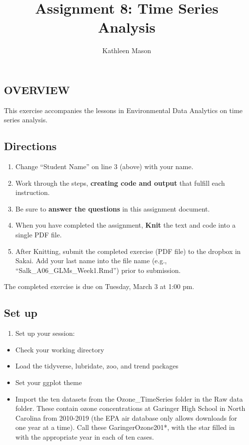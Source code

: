 \documentclass[]{article}
\title{Assignment 8: Time Series Analysis}
\author{Kathleen Mason}
\date{}
\providecommand{\tightlist}{%
  \setlength{\itemsep}{0pt}\setlength{\parskip}{0pt}}
\begin{document}
\maketitle

\hypertarget{overview}{%
\subsection{OVERVIEW}\label{overview}}

This exercise accompanies the lessons in Environmental Data Analytics on
time series analysis.

\hypertarget{directions}{%
\subsection{Directions}\label{directions}}

\begin{enumerate}
\def\labelenumi{\arabic{enumi}.}
\tightlist
\item
  Change ``Student Name'' on line 3 (above) with your name.
\item
  Work through the steps, \textbf{creating code and output} that fulfill
  each instruction.
\item
  Be sure to \textbf{answer the questions} in this assignment document.
\item
  When you have completed the assignment, \textbf{Knit} the text and
  code into a single PDF file.
\item
  After Knitting, submit the completed exercise (PDF file) to the
  dropbox in Sakai. Add your last name into the file name (e.g.,
  ``Salk\_A06\_GLMs\_Week1.Rmd'') prior to submission.
\end{enumerate}

The completed exercise is due on Tuesday, March 3 at 1:00 pm.

\hypertarget{set-up}{%
\subsection{Set up}\label{set-up}}

\begin{enumerate}
\def\labelenumi{\arabic{enumi}.}
\tightlist
\item
  Set up your session:
\end{enumerate}

\begin{itemize}
\tightlist
\item
  Check your working directory
\item
  Load the tidyverse, lubridate, zoo, and trend packages
\item
  Set your ggplot theme
\item
  Import the ten datasets from the Ozone\_TimeSeries folder in the Raw
  data folder. These contain ozone concentrations at Garinger High
  School in North Carolina from 2010-2019 (the EPA air database only
  allows downloads for one year at a time). Call these
  GaringerOzone201*, with the star filled in with the appropriate year
  in each of ten cases.
\end{itemize}
\end{document}

